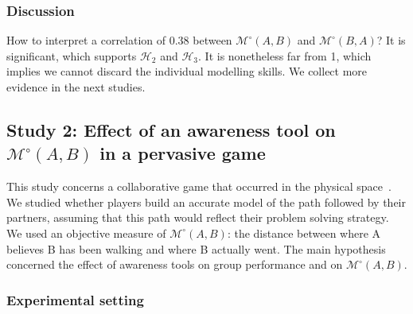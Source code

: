 \documentclass[natbib]{svjour3}
\newcommand{\A}{A\xspace}
\newcommand{\B}{B\xspace}
\newcommand{\gModel}[2]{{$\mathcal{M}^{\circ}(#1, #2)$}}
\begin{document}
\subsubsection*{Discussion}

How to interpret a correlation of 0.38 between \gModel{A}{B} and \gModel{B}{A}?
It is significant, which supports $\mathcal{H}_{2}$ and $\mathcal{H}_{3}$. It is
nonetheless far from 1, which implies we cannot discard the individual modelling
skills. We collect more evidence in the next studies.



\subsection{{\bf Study 2}: Effect of an awareness tool on \gModel{A}{B}  in a pervasive
game}

This study concerns a collaborative game that occurred in the physical
space~\citep{nova2006underwhelming}. We studied whether players
build an accurate model of the path followed by their partners, assuming that this
path would reflect their problem solving strategy. We used an objective measure of
\gModel{A}{B}: the distance between where \A believes \B has been walking and
where \B actually went.  The main hypothesis concerned the effect of awareness
tools on group performance and on \gModel{A}{B}. 

\subsubsection*{Experimental setting}
\end{document}
